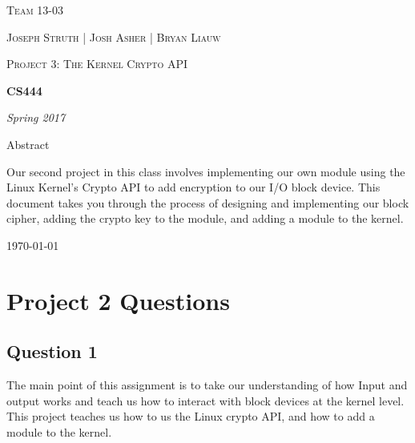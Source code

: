 \documentclass[10pt,draftclsnofoot,onecolumn, compsoc]{IEEEtran}
\begin{document}
\begin{titlepage}
	\centering
	{\scshape\LARGE Team 13-03 \par}
	\vspace{1cm}
	{\scshape\Large Joseph Struth  |  Josh Asher  |   Bryan Liauw\par}
    \vspace{1cm}
    	{\scshape\Large Project 3: The Kernel Crypto API \par}
	\vspace{1.5cm}
	{\huge\bfseries CS444\par}
	\vspace{2cm}
	{\Large\itshape Spring 2017\par}
	\vspace{4cm}
	{\large Abstract\par}
	\vspace{1cm}
	Our second project in this class involves implementing our own module using the Linux Kernel's Crypto API to add encryption to our I/O block device.
	This document takes you through the process of designing and implementing our block cipher, adding the crypto key to the module, and adding a module to the kernel.
	\vfill

	{\large \today\par}
\end{titlepage}


%
%



\section{Project 2 Questions}
\subsection{Question 1}
The main point of this assignment is to take our understanding of how Input and output works and teach us how to interact with block devices at the kernel level. This project teaches us how to us the Linux crypto API, and how to add a module to the kernel. 
\end{document}
